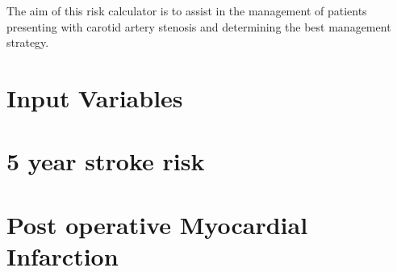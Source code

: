 \documentclass[
]{book}
\begin{document}
The aim of this risk calculator is to assist in the management of patients presenting with carotid artery stenosis and determining the best management strategy.

\hypertarget{input-variables-2}{%
\section{Input Variables}\label{input-variables-2}}

\hypertarget{year-stroke-risk}{%
\section{5 year stroke risk}\label{year-stroke-risk}}

\hypertarget{post-operative-myocardial-infarction-1}{%
\section{Post operative Myocardial Infarction}\label{post-operative-myocardial-infarction-1}}

  
\end{document}
